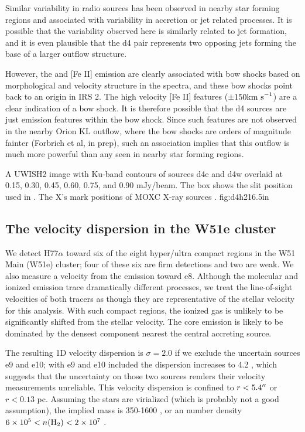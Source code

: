 Similar variability in radio sources has been observed in nearby star forming
regions \citep{Liu2014c,Forbrich2013a} and associated with variability in
accretion or jet related processes.  It is possible that the variability
observed here is similarly related to jet formation, and it is even plausible
that the d4 pair represents two opposing jets forming the base of a larger
outflow structure.

However, the \hh and [Fe II] emission are clearly associated with bow shocks
based on morphological and velocity structure in the \citet{Hodapp2002a}
spectra, and these bow shocks point back to an origin in IRS 2.  The high
velocity [Fe II] features ($\pm150 \textrm{km~s}^{-1}$) are a clear indication of a bow
shock.  It is therefore possible that the d4 sources are just emission features
within the bow shock.  Since such features are not observed in the nearby Orion
KL outflow, where the bow shocks are orders of magnitude fainter (Forbrich et
al, in prep), such an association implies that this outflow is much more
powerful than any seen in nearby star forming regions.

{A UWISH2 \hh image with Ku-band contours of sources d4e and d4w overlaid at
0.15, 0.30, 0.45, 0.60, 0.75, and 0.90 mJy/beam.  The box shows the slit
position used in \citet{Hodapp2002a}.  The X's mark positions of MOXC X-ray
sources \citep{Townsley2014a}.
}
{fig:d4h2}{1}{6.5in}

\subsection{The velocity dispersion in the W51e cluster}
\label{sec:vdisp}
We detect H77$\alpha$ toward six of the eight hyper/ultra compact \hii regions
in the W51 Main (W51e) cluster; four of these six are firm detections and two
are weak.  We also measure a velocity from the \formaldehyde emission toward
e8.  Although the molecular and ionized emission trace dramatically different
processes, we treat the line-of-sight velocities of both tracers as though they
are representative of the stellar velocity for this analysis.  With such
compact \hii regions, the ionized gas is unlikely to be significantly shifted
from the stellar velocity.  The core emission is likely to be dominated by the
densest component nearest the central accreting source.

The resulting 1D velocity dispersion is $\sigma=2.0$ \kms if we exclude
the uncertain sources e9
and e10; with e9 and e10 included the dispersion increases to 4.2 \kms, which
suggests that the uncertainty on those two sources renders their velocity
measurements unreliable.  This velocity dispersion is confined to
$r<5.4\mbox{$^{\prime\prime}$}$ or $r<0.13$ pc.  Assuming the stars are virialized (which is
probably not a good assumption), the implied mass is 350-1600 \msun, or an \hh
number density $6\times10^{5} < n(\textrm{H}_{2}) < 2\times10^{7}$ \percc.

